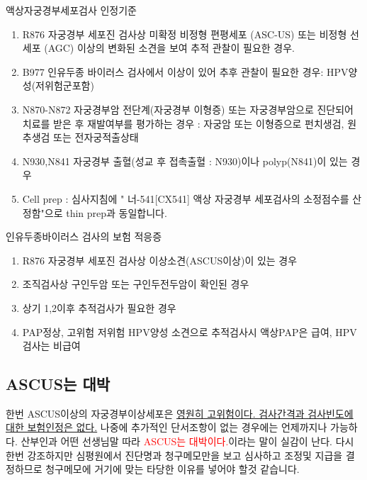 {액상자궁경부세포검사 인정기준
\begin{enumerate}\tightlist
\item R876 자궁경부 세포진 검사상 미확정 비정형 편평세포 (ASC-US) 또는 비정형 선세포 (AGC) 이상의 변화된 소견을 보여 추적 관찰이 필요한 경우.
\item B977 인유두종 바이러스 검사에서 이상이 있어 추후 관찰이 필요한 경우: HPV양성(저위험군포함)
\item N870-N872 자궁경부암 전단계(자궁경부 이형증) 또는 자궁경부암으로 진단되어 치료를 받은 후 재발여부를 평가하는 경우
: 자궁암 또는 이형증으로 펀치생검, 원추생검 또는 전자궁적출상태
\item N930,N841 자궁경부 출혈(성교 후 접촉출혈 : N930)이나 polyp(N841)이 있는 경우 
\item Cell prep : 심사지침에 " 너-541[CX541] 액상 자궁경부 세포검사의 소정점수를 산정함"으로 thin prep과 동일합니다.
\end{enumerate}

인유두종바이러스 검사의 보험 적응증
\begin{enumerate}\tightlist 
\item R876 자궁경부 세포진 검사상 이상소견(ASCUS이상)이 있는 경우
\item 조직검사상 구인두암 또는 구인두전두암이 확인된 경우
\item 상기 1,2이후 추적검사가 필요한 경우
\item PAP정상, 고위험 저위험 HPV양성 소견으로 추적검사시 액상PAP은 급여, HPV검사는 비급여
\end{enumerate}}

\subsection{ASCUS는 대박}
한번 ASCUS이상의 자궁경부이상세포은 \uline{영원히 고위험이다. 검사간격과 검사빈도에 대한 보험인정은 없다.} 나중에 추가적인 단서조항이 없는 경우에는 언제까지나 가능하다. 산부인과 어떤 선생님말 따라 \textcolor{red}{ASCUS는 대박이다.}이라는 말이 실감이 난다. 다시 한번 강조하지만 심평원에서 진단명과 청구메모만을 보고 심사하고 조정및 지급을 결정하므로 청구메모에 거기에 맞는 타당한 이유를 넣어야 할것 같습니다.

